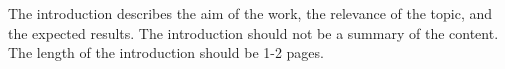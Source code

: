 The introduction describes the aim of the work, the relevance of the topic, and the expected results.
The introduction should not be a summary of the content. The length of the introduction should be 1-2 pages.